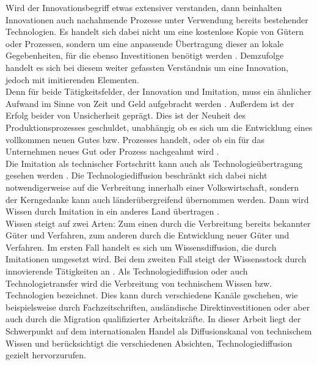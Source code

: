 Wird der Innovationsbegriff etwas extensiver verstanden, dann beinhalten Innovationen auch nachahmende Prozesse unter Verwendung bereits bestehender Technologien. Es handelt sich dabei nicht um eine kostenlose Kopie von G{\"u}tern oder Prozessen, sondern um eine anpassende {\"U}bertragung dieser an lokale Gegebenheiten, f{\"u}r die ebenso Investitionen ben{\"o}tigt werden \citep{Arrow.1969,Evenson.1995}. Demzufolge handelt es sich bei diesem weiter gefassten Verständnis um eine Innovation, jedoch mit imitierenden Elementen.\\


Denn für beide T{\"a}tigkeitsfelder, der Innovation und Imitation, muss ein {\"a}hnlicher Aufwand im Sinne von Zeit und Geld aufgebracht werden \citep{Cohen.1989,Griffith.2004}. Au{\ss}erdem ist der Erfolg beider von Unsicherheit gepr{\"a}gt. Dies ist der Neuheit des Produktionsprozesses geschuldet, unabh{\"a}ngig ob es sich um die Entwicklung eines vollkommen neuen Gutes bzw. Prozesses handelt, oder ob ein  f{\"u}r das Unternehmen neues Gut oder Prozess nachgeahmt wird \citep{Segerstrom.1991}.\\


Die Imitation als technischer Fortschritt kann auch als Technologie{\"u}bertragung gesehen werden \citep{Nelson.1966,Cohen.1989,Griffith.2004}. Die Technologiediffusion beschränkt sich dabei nicht notwendigerweise auf die Verbreitung innerhalb einer Volkswirtschaft, sondern der Kerngedanke kann auch l{\"a}nder{\"u}bergreifend {\"u}bernommen werden. Dann wird Wissen durch Imitation in ein anderes Land {\"u}bertragen \citep{Nelson.1966}.\\




Wissen steigt auf zwei Arten: Zum einen durch die Verbreitung bereits bekannter G{\"u}ter und Verfahren, zum anderen durch die Entwicklung neuer G{\"u}ter und Verfahren. Im ersten Fall handelt es sich um Wissensdiffusion, die durch Imitationen umgesetzt wird. Bei dem zweiten Fall steigt der Wissensstock durch innovierende Tätigkeiten an \citep{Schmookler.1966}.
Als Technologiediffusion oder auch Technologietransfer wird die Verbreitung von technischem Wissen bzw. Technologien bezeichnet. Dies kann durch verschiedene Kan{\"a}le geschehen, wie beispielsweise durch Fachzeitschriften, ausl{\"a}ndische Direktinvestitionen oder aber auch durch die Migration qualifizierter Arbeitskr{\"a}fte. In dieser Arbeit liegt der Schwerpunkt auf dem internationalen Handel als Diffusionskanal von technischem Wissen und ber{\"u}cksichtigt die verschiedenen Absichten, Technologiediffusion gezielt hervorzurufen.\newline


